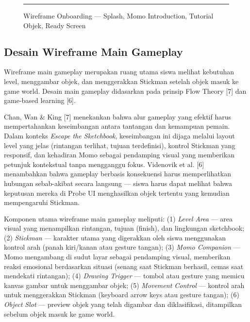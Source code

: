 \documentclass[12pt,oneside]{report}
\begin{document}
\begin{figure}[H]
    \centering
    \rule{0.9\textwidth}{6cm}
    \caption{Wireframe Onboarding --- Splash, Momo Introduction, Tutorial Objek, Ready Screen}
    \label{fig:wireframe-onboarding}
\end{figure}


\subsection{Desain Wireframe Main Gameplay}
\label{subsec:wireframe-main-gameplay}

Wireframe main gameplay merupakan ruang utama siswa melihat kebutuhan level, menggambar objek, dan menggerakkan Stickman setelah objek masuk ke game world. Desain main gameplay didasarkan pada prinsip Flow Theory [7] dan game-based learning [6].

Chan, Wan \& King [7] menekankan bahwa alur gameplay yang efektif harus mempertahankan keseimbangan antara tantangan dan kemampuan pemain. Dalam konteks \textit{Escape the Sketchbook}, keseimbangan ini dijaga melalui layout level yang jelas (rintangan terlihat, tujuan terdefinisi), kontrol Stickman yang responsif, dan kehadiran Momo sebagai pendamping visual yang memberikan petunjuk kontekstual tanpa mengganggu fokus. Videnovik et al. [6] menambahkan bahwa gameplay berbasis konsekuensi harus memperlihatkan hubungan sebab-akibat secara langsung --- siswa harus dapat melihat bahwa keputusan mereka di Probe UI menghasilkan objek tertentu yang kemudian mempengaruhi Stickman.

Komponen utama wireframe main gameplay meliputi: (1) \textit{Level Area} --- area visual yang menampilkan rintangan, tujuan (finish), dan lingkungan sketchbook; (2) \textit{Stickman} --- karakter utama yang digerakkan oleh siswa menggunakan kontrol arah (panah kiri/kanan atau gesture tangan); (3) \textit{Momo Companion} --- Momo mengambang di sudut layar sebagai pendamping visual, memberikan reaksi emosional berdasarkan situasi (senang saat Stickman berhasil, cemas saat mendekati rintangan); (4) \textit{Drawing Trigger} --- tombol atau gesture yang memicu kanvas gambar untuk menggambar objek; (5) \textit{Movement Control} --- kontrol arah untuk menggerakkan Stickman (keyboard arrow keys atau gesture tangan); (6) \textit{Object Slot} --- preview objek yang telah digambar dan diklasifikasi, ditampilkan sebelum objek masuk ke game world.
\end{document}
